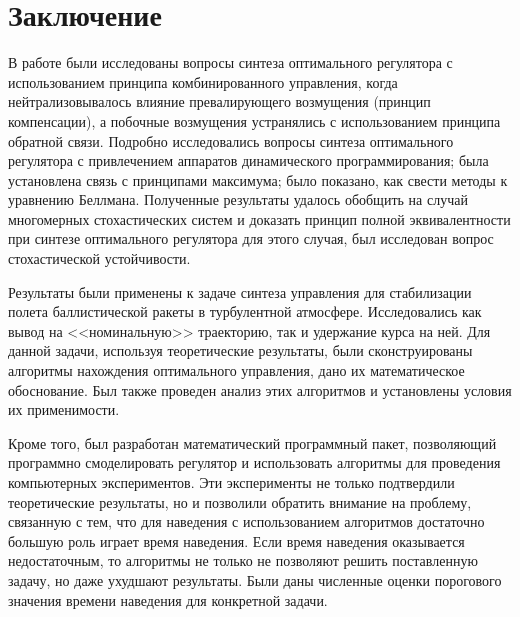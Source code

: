 


\chapter*{Заключение}



В работе были исследованы вопросы синтеза оптимального регулятора с использованием принципа комбинированного управления, когда нейтрализовывалось влияние превалирующего возмущения (принцип компенсации), а побочные возмущения устранялись с использованием принципа обратной связи. Подробно исследовались вопросы синтеза оптимального регулятора с привлечением аппаратов динамического программирования; была установлена связь с принципами максимума; было показано, как свести методы к уравнению Беллмана. Полученные результаты удалось обобщить на случай многомерных стохастических систем и доказать принцип полной эквивалентности при синтезе оптимального регулятора для этого случая, был исследован вопрос стохастической устойчивости.

Результаты были применены к задаче синтеза управления для стабилизации полета баллистической ракеты в турбулентной атмосфере. Исследовались как вывод на <<номинальную>> траекторию, так и удержание курса на ней. Для данной задачи, используя теоретические результаты, были сконструированы алгоритмы нахождения оптимального управления, дано их математическое обоснование. Был также проведен анализ этих алгоритмов и установлены условия их применимости.

Кроме того, был разработан математический программный пакет, позволяющий программно смоделировать регулятор и использовать алгоритмы для проведения компьютерных экспериментов. Эти эксперименты не только подтвердили теоретические результаты, но и позволили обратить внимание на проблему, связанную с тем, что для наведения с использованием алгоритмов достаточно большую роль играет время наведения. Если время наведения оказывается недостаточным, то алгоритмы не только не позволяют решить поставленную задачу, но даже ухудшают результаты. Были даны численные оценки порогового значения времени наведения для конкретной задачи.
